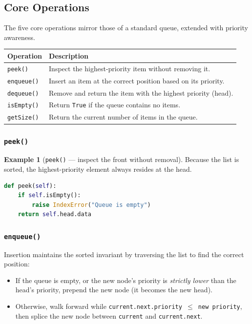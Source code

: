 \documentclass[11pt, a4paper, notitlepage]{report}
\theoremstyle{definition}
\theoremstyle{remark}
\theoremstyle{definition}
\newtheorem{example}[theorem]{Example}
\begin{document}
\subsection{Core Operations}
\label{subsec:pq-operations}

The five core operations mirror those of a standard queue, extended with priority awareness.

\begin{center}
\begin{tabularx}{\linewidth}{@{} l X @{}}
\toprule
\textbf{Operation} & \textbf{Description} \\
\midrule
\texttt{peek()}     & Inspect the highest-priority item without removing it. \\
\texttt{enqueue()}  & Insert an item at the correct position based on its priority. \\
\texttt{dequeue()}  & Remove and return the item with the highest priority (head). \\
\texttt{isEmpty()}  & Return \texttt{True} if the queue contains no items. \\
\texttt{getSize()}  & Return the current number of items in the queue. \\
\bottomrule
\end{tabularx}
\end{center}

\subsubsection{\texttt{peek()}}
\label{subsubsec:pq-peek}

\begin{example}[\texttt{peek()} --- inspect the front without removal]
\label{ex:pq-peek}
Because the list is sorted, the highest-priority element always resides at the head.
\begin{lstlisting}[language=Python]
def peek(self):
    if self.isEmpty():
        raise IndexError("Queue is empty")
    return self.head.data
\end{lstlisting}
\end{example}

\subsubsection{\texttt{enqueue()}}
\label{subsubsec:pq-enqueue}

Insertion maintains the sorted invariant by traversing the list to find the correct position:
\begin{itemize}
  \item If the queue is empty, or the new node's priority is \emph{strictly lower} than the
        head's priority, prepend the new node (it becomes the new head).
  \item Otherwise, walk forward while \texttt{current.next.priority $\leq$ new priority},
        then splice the new node between \texttt{current} and \texttt{current.next}.
\end{itemize}
\end{document}
